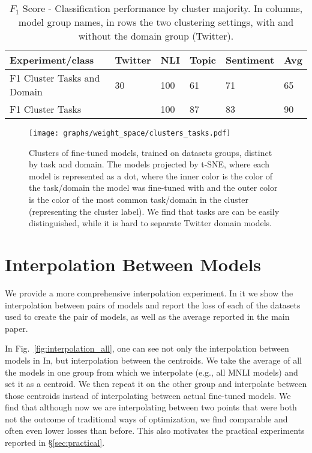 \documentclass[nohyperref]{article}
\theoremstyle{plain}
\theoremstyle{definition}
\theoremstyle{remark}
\begin{document}
 \begin{table}[]
     \centering
 \small
\begin{tabular}{|l|l|l|l|l|l|}
\hline
Experiment/class            & Twitter & NLI & Topic & Sentiment & Avg \\ \hline
F1 Cluster Tasks and Domain & 30      & 100 & 61    & 71        & 65  \\ \hline
F1 Cluster Tasks            &         & 100 & 87    & 83        & 90  \\ \hline
\end{tabular}
     \caption{$F_1$ Score - Classification performance by cluster majority. In columns, model group names, in rows the two clustering settings, with and without the domain group (Twitter).}
     \label{tab:clusters_of_tasks_and_domain}
 \end{table}

\begin{figure*}[t]
    \texttt{[image: graphs/weight\_space/clusters\_tasks.pdf]}
    \label{fig:clusters_of_tasks_and_domain}
\caption{Clusters of fine-tuned models, trained on datasets groups, distinct by task and domain. The models projected by t-SNE, where each model is represented as a dot, where the inner color is the color of the task/domain the model was fine-tuned with and the outer color is the color of the most common task/domain in the cluster (representing the cluster label). 
We find that tasks are can be easily distinguished, while it is hard to separate Twitter domain models.
}
\end{figure*}


\section{Interpolation Between Models}\label{ap:sec:interpolations}
We provide a more comprehensive interpolation experiment. In it we show the interpolation between pairs of models and report the loss of each of the datasets used to create the pair of models, as well as the average reported in the main paper.

In Fig.~\ref{fig:interpolation_all}, one can see not only the interpolation between models in In, but interpolation between the centroids. We take the average of all the models in one group from which we interpolate (e.g., all MNLI models) and set it as a centroid. We then repeat it on the other group and interpolate between those centroids instead of interpolating between actual fine-tuned models.
We find that although now we are interpolating between two points that were both not the outcome of traditional ways of optimization, we find comparable and often even lower losses than before. This also motivates the practical experiments reported in \S\ref{sec:practical}.
\end{document}
